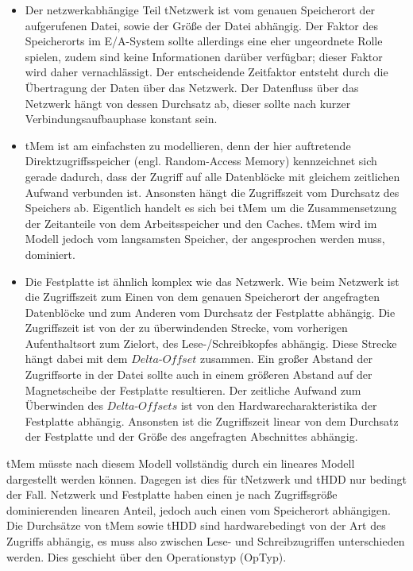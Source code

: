 \documentclass[
	12pt,
	a4paper,
	BCOR10mm,
	DIV14,
	listof=totoc,
	bibliography=totoc,
	headsepline
]{scrreprt}
\begin{document}
\begin{itemize}
	\item Der netzwerkabhängige Teil tNetzwerk ist vom genauen Speicherort der aufgerufenen Datei, sowie der Größe der Datei abhängig. Der Faktor des Speicherorts im E/A-System sollte allerdings eine eher ungeordnete Rolle spielen, zudem sind keine Informationen darüber verfügbar; dieser Faktor wird daher vernachlässigt. 
	Der entscheidende Zeitfaktor entsteht durch die Übertragung der Daten über das Netzwerk. Der Datenfluss über das Netzwerk hängt von dessen Durchsatz ab, dieser sollte nach kurzer Verbindungsaufbauphase konstant sein.
	\item tMem ist am einfachsten zu modellieren, denn der hier auftretende Direktzugriffsspeicher (engl. Random-Access Memory) kennzeichnet sich gerade dadurch, dass der Zugriff auf alle Datenblöcke mit gleichem zeitlichen Aufwand verbunden ist.
	Ansonsten hängt die Zugriffszeit vom Durchsatz des Speichers ab.
	Eigentlich handelt es sich bei tMem um die Zusammensetzung der Zeitanteile von dem Arbeitsspeicher und den Caches. tMem wird im Modell jedoch vom langsamsten Speicher, der angesprochen werden muss, dominiert.
	\item Die Festplatte ist ähnlich komplex wie das Netzwerk. Wie beim Netzwerk ist die Zugriffszeit zum Einen von dem genauen Speicherort der angefragten Datenblöcke und zum Anderen vom Durchsatz der Festplatte abhängig.
	Die Zugriffszeit ist von der zu überwindenden Strecke, vom vorherigen Aufenthaltsort zum Zielort, des Lese-/Schreibkopfes abhängig.
	Diese Strecke hängt dabei mit dem $Delta\text{-}Offset$ zusammen.
	Ein großer Abstand der Zugriffsorte in der Datei sollte auch in einem größeren Abstand auf der Magnetscheibe der Festplatte resultieren.
	Der zeitliche Aufwand zum Überwinden des $Delta\text{-}Offsets$ ist von den Hardwarecharakteristika der Festplatte abhängig. Ansonsten ist die Zugriffszeit linear von dem Durchsatz der Festplatte und der Größe des angefragten Abschnittes abhängig.
\end{itemize}

tMem müsste nach diesem Modell vollständig durch ein lineares Modell dargestellt werden können. Dagegen ist dies für tNetzwerk und tHDD nur bedingt der Fall.
Netzwerk und Festplatte haben einen je nach Zugriffsgröße dominierenden linearen Anteil, jedoch auch einen vom Speicherort abhängigen.
Die Durchsätze von tMem sowie tHDD sind hardwarebedingt von der Art des Zugriffs abhängig, es muss also zwischen Lese- und Schreibzugriffen unterschieden werden.
Dies geschieht über den Operationstyp (OpTyp).
\end{document}
